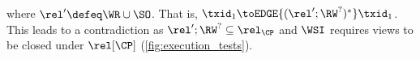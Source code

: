 %
\noindent where \( \rel' \defeq \WR \cup \SO \).
That is, \( \txid_1 \toEDGE{( \rel'; \RW^? )^* } \txid_1 \).
This leads to a contradiction as \( \rel'; \RW^? \subseteq \rel_\CP \) and 
\( \WSI \) requires views to be closed under \( \rel[\CP] \) (\cref{fig:execution_tests}). 




